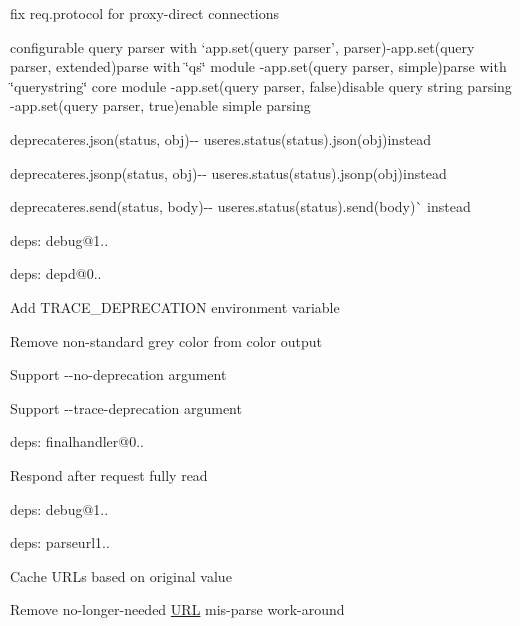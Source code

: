 {\ttfamily 
\begin{DoxyItemize}
\item fix {\ttfamily req.\+protocol} for proxy-\/direct connections
\item configurable query parser with `app.\+set(\textquotesingle{}query parser', parser){\ttfamily  -\/}app.\+set(\textquotesingle{}query parser\textquotesingle{}, \textquotesingle{}extended\textquotesingle{}){\ttfamily parse with \char`\"{}qs\char`\"{} module -\/}app.\+set(\textquotesingle{}query parser\textquotesingle{}, \textquotesingle{}simple\textquotesingle{}){\ttfamily parse with \char`\"{}querystring\char`\"{} core module -\/}app.\+set(\textquotesingle{}query parser\textquotesingle{}, false){\ttfamily disable query string parsing -\/}app.\+set(\textquotesingle{}query parser\textquotesingle{}, true){\ttfamily enable simple parsing}
\item {\ttfamily deprecate}res.\+json(status, obj){\ttfamily -\/-\/ use}res.\+status(status).json(obj){\ttfamily instead}
\item {\ttfamily deprecate}res.\+jsonp(status, obj){\ttfamily -\/-\/ use}res.\+status(status).jsonp(obj){\ttfamily instead}
\item {\ttfamily deprecate}res.\+send(status, body){\ttfamily -\/-\/ use}res.\+status(status).send(body)\`{} instead
\item deps\+: debug@1..
\item deps\+: depd@0..
\begin{DoxyItemize}
\item Add {\ttfamily T\+R\+A\+C\+E\+\_\+\+D\+E\+P\+R\+E\+C\+A\+T\+I\+ON} environment variable
\item Remove non-\/standard grey color from color output
\item Support {\ttfamily -\/-\/no-\/deprecation} argument
\item Support {\ttfamily -\/-\/trace-\/deprecation} argument
\end{DoxyItemize}
\item deps\+: finalhandler@0..
\begin{DoxyItemize}
\item Respond after request fully read
\item deps\+: debug@1..
\end{DoxyItemize}
\item deps\+: parseurl1..
\begin{DoxyItemize}
\item Cache U\+R\+Ls based on original value
\item Remove no-\/longer-\/needed \mbox{\hyperlink{namespace_u_r_l}{U\+RL}} mis-\/parse work-\/around

\end{DoxyItemize}
\end{DoxyItemize}}
